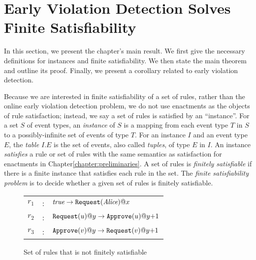 \section{Early Violation Detection Solves Finite Satisfiability}
\label{section:finite-satisfiability-definitions}

In this section, we present the chapter's main result.
We first give the necessary definitions
for instances and finite satisfiability.
We then state the main theorem
and outline its proof.
Finally, we present
a corollary related to early violation detection.

Because we are interested in finite satisfiability of a set of rules,
rather than the online early violation detection problem,
we do not use enactments as the objects of rule satisfaction;
instead, we say a set of rules is satisfied by an ``instance''.
For a set $S$ of event types,
an {\em instance} of $S$
is a mapping from each event type $T$ in $S$ to
a possibly-infinite set of events of type $T$.
For an instance $I$ and an event type $E$,
the {\em table} $I.E$ is the set of events,
also called {\em tuples},
of type $E$ in $I$.
An instance {\em satisfies} a rule or set of rules
with the same semantics
as satisfaction
for enactments
in Chapter\:\ref{chapter:preliminaries}.
A set of rules is {\it finitely satisfiable}
if there is a finite instance
that satisfies each rule in the set.
The {\em finite satisfiability problem} is to decide
whether a given set of rules is finitely satisfiable.


\begin{figure}[h!]
    \centering
\begin{tabular}{|lcl|}
\hline
$r_1$ &:& $\textit{true} \rightarrow \texttt{Request}(\mbox{\em Alice})@x$\\
$r_2$ &:& $\texttt{Request}(u)@y \rightarrow \texttt{Approve}(u)@y{+}1$\\
$r_3$ &:& $\texttt{Approve}(v)@y \rightarrow \texttt{Request}(v)@y{+}1$\\
\hline
\end{tabular}
    \caption{Set of rules that is not finitely satisfiable}
    \label{fig:unsat-constraint-rules}
\end{figure}

